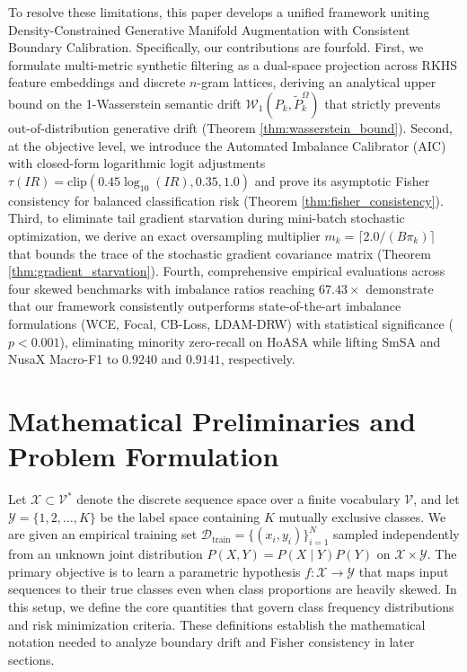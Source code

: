 \documentclass[10pt,journal,compsoc]{IEEEtran}
\begin{document}

To resolve these limitations, this paper develops a unified framework uniting Density-Constrained Generative Manifold Augmentation with Consistent Boundary Calibration. Specifically, our contributions are fourfold. First, we formulate multi-metric synthetic filtering as a dual-space projection across RKHS feature embeddings and discrete $n$-gram lattices, deriving an analytical upper bound on the 1-Wasserstein semantic drift $\mathcal{W}_1(P_k, \tilde{P}_k^{\Omega})$ that strictly prevents out-of-distribution generative drift (Theorem \ref{thm:wasserstein_bound}). Second, at the objective level, we introduce the Automated Imbalance Calibrator (AIC) with closed-form logarithmic logit adjustments $\tau(IR) = \mathrm{clip}(0.45 \log_{10}(IR), 0.35, 1.0)$ and prove its asymptotic Fisher consistency for balanced classification risk (Theorem \ref{thm:fisher_consistency}). Third, to eliminate tail gradient starvation during mini-batch stochastic optimization, we derive an exact oversampling multiplier $m_k = \lceil 2.0 / (B \pi_k) \rceil$ that bounds the trace of the stochastic gradient covariance matrix (Theorem \ref{thm:gradient_starvation}). Fourth, comprehensive empirical evaluations across four skewed benchmarks with imbalance ratios reaching $67.43\times$ demonstrate that our framework consistently outperforms state-of-the-art imbalance formulations (WCE, Focal, CB-Loss, LDAM-DRW) with statistical significance ($p < 0.001$), eliminating minority zero-recall on HoASA while lifting SmSA and NusaX Macro-F1 to $0.9240$ and $0.9141$, respectively.


\section{Mathematical Preliminaries and Problem Formulation}
\label{sec:preliminaries}

Let $\mathcal{X} \subset \mathcal{V}^*$ denote the discrete sequence space over a finite vocabulary $\mathcal{V}$, and let $\mathcal{Y} = \{1, 2, \dots, K\}$ be the label space containing $K$ mutually exclusive classes. We are given an empirical training set $\mathcal{D}_{\text{train}} = \{(x_i, y_i)\}_{i=1}^N$ sampled independently from an unknown joint distribution $P(X, Y) = P(X \mid Y)P(Y)$ on $\mathcal{X} \times \mathcal{Y}$. The primary objective is to learn a parametric hypothesis $f: \mathcal{X} \to \mathcal{Y}$ that maps input sequences to their true classes even when class proportions are heavily skewed. In this setup, we define the core quantities that govern class frequency distributions and risk minimization criteria. These definitions establish the mathematical notation needed to analyze boundary drift and Fisher consistency in later sections.
\end{document}
